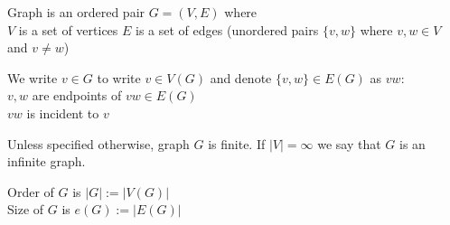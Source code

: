 {\color{def}Graph} is an ordered pair $G=(V,E)$ where\\
    \point $V$ is a set of vertices
    \point $E$ is a set of edges (unordered pairs $\{v,w\}$ where $v,w\in V$ and $v\neq w$)
\medskip

We write $v\in G$ to write $v\in V(G)$ and denote $\{v,w\}\in E(G)$ as $vw$:\\
\point $v,w$ are endpoints of $vw\in E(G)$\\
\point $vw$ is incident to $v$
\medskip

Unless specified otherwise, graph $G$ is finite. If $|V|=\infty$ we say that $G$ is an infinite graph.
\medskip

{\color{def}Order of $G$} is $|G|:=|V(G)|$\\
{\color{def}Size of $G$} is $e(G):=|E(G)|$